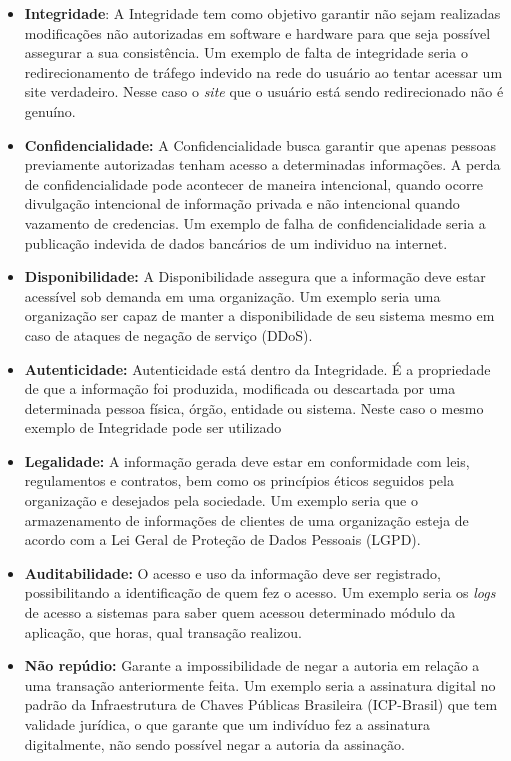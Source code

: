 \begin{itemize}
   \item \textbf{Integridade}: A Integridade tem como objetivo garantir não sejam realizadas modificações não autorizadas em software e hardware para que seja possível assegurar a sua consistência. Um exemplo de falta de integridade seria o redirecionamento de tráfego indevido na rede do usuário ao tentar acessar um site verdadeiro. Nesse caso o \textit{site} que o usuário está sendo redirecionado não é genuíno.
    
   \item \textbf{Confidencialidade:} A Confidencialidade busca garantir que apenas pessoas previamente autorizadas tenham acesso a determinadas informações. A perda de confidencialidade pode acontecer de maneira intencional, quando ocorre divulgação intencional de informação privada e não intencional quando vazamento de credencias. Um exemplo de falha de confidencialidade seria a publicação indevida de dados bancários de um individuo na internet.
   
        
   \item \textbf{Disponibilidade:} A Disponibilidade assegura que a informação deve estar acessível sob demanda em uma organização. Um exemplo seria uma organização ser capaz de manter a disponibilidade de seu sistema mesmo em caso de ataques de negação de serviço (DDoS). 
        
   \item \textbf{Autenticidade: }Autenticidade está dentro da Integridade. É a propriedade de que a informação foi produzida, modificada ou descartada por uma determinada pessoa física, órgão, entidade ou sistema. Neste caso o mesmo exemplo de Integridade pode ser utilizado
    
   \item \textbf{Legalidade:} A informação gerada deve estar em conformidade com leis, regulamentos e contratos, bem como os princípios éticos seguidos pela organização e desejados pela sociedade. Um exemplo seria que o armazenamento de informações de clientes de uma organização esteja de acordo com a Lei Geral de Proteção de Dados Pessoais (LGPD).
    
   \item \textbf{Auditabilidade:} O acesso e uso da informação deve ser registrado, possibilitando a identificação de quem fez o acesso. Um exemplo seria os \textit{logs} de acesso a sistemas para saber quem acessou determinado módulo da aplicação, que horas, qual transação realizou.
    
   \item\textbf{ Não repúdio:} Garante a impossibilidade de negar a autoria em relação a uma transação anteriormente feita. Um exemplo seria a assinatura digital no padrão da Infraestrutura de Chaves Públicas Brasileira (ICP-Brasil) que tem validade jurídica, o que garante que um indivíduo fez a assinatura digitalmente, não sendo possível negar a autoria da assinação.
    
    
\end{itemize}




